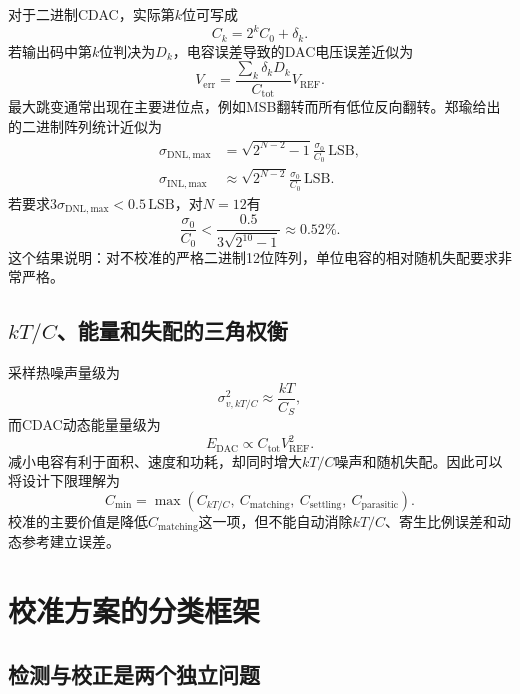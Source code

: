 \documentclass[UTF8,a4paper,11pt]{ctexart}
\newcommand{\LSB}{\mathrm{LSB}}
\newcommand{\Vref}{V_{\mathrm{REF}}}
\begin{document}
对于二进制CDAC，实际第$k$位可写成
\begin{equation}
C_k=2^kC_0+\delta_k.
\end{equation}
若输出码中第$k$位判决为$D_k$，电容误差导致的DAC电压误差近似为
\begin{equation}
V_{\mathrm{err}}=\frac{\sum_k\delta_kD_k}{C_{\mathrm{tot}}}\Vref.
\label{eq:dac_error}
\end{equation}
最大跳变通常出现在主要进位点，例如MSB翻转而所有低位反向翻转。郑瑜给出的二进制阵列统计近似为\cite{zheng2024}
\begin{align}
\sigma_{\mathrm{DNL,max}}&=\sqrt{2^{N-2}-1}\frac{\sigma_0}{C_0}\,\LSB,\\
\sigma_{\mathrm{INL,max}}&\approx\sqrt{2^{N-2}}\frac{\sigma_0}{C_0}\,\LSB.
\end{align}
若要求$3\sigma_{\mathrm{DNL,max}}<0.5\,\LSB$，对$N=12$有
\begin{equation}
\frac{\sigma_0}{C_0}<\frac{0.5}{3\sqrt{2^{10}-1}}\approx0.52\%.
\label{eq:12bit_req}
\end{equation}
这个结果说明：对不校准的严格二进制12位阵列，单位电容的相对随机失配要求非常严格。

\subsection{\texorpdfstring{$kT/C$}{kT/C}、能量和失配的三角权衡}

采样热噪声量级为
\begin{equation}
\sigma_{v,kT/C}^2\approx\frac{kT}{C_S},
\end{equation}
而CDAC动态能量量级为
\begin{equation}
E_{\mathrm{DAC}}\propto C_{\mathrm{tot}}\Vref^2.
\end{equation}
减小电容有利于面积、速度和功耗，却同时增大$kT/C$噪声和随机失配。因此可以将设计下限理解为
\begin{equation}
C_{\min}=\max\left(C_{kT/C},\ C_{\mathrm{matching}},\ C_{\mathrm{settling}},\ C_{\mathrm{parasitic}}\right).
\end{equation}
校准的主要价值是降低$C_{\mathrm{matching}}$这一项，但不能自动消除$kT/C$、寄生比例误差和动态参考建立误差。

\section{校准方案的分类框架}

\subsection{检测与校正是两个独立问题}
\end{document}
